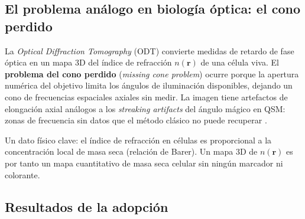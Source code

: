\documentclass[12pt, a4paper]{article}
\begin{document}
\subsection{El problema análogo en biología óptica: el cono perdido}

La \emph{Optical Diffraction Tomography} (ODT) convierte medidas de retardo de fase óptica en un mapa 3D del índice de refracción $n(\mathbf{r})$ de una célula viva. El \textbf{problema del cono perdido} (\emph{missing cone problem}) ocurre porque la apertura numérica del objetivo limita los ángulos de iluminación disponibles, dejando un cono de frecuencias espaciales axiales sin medir. La imagen tiene artefactos de elongación axial análogos a los \emph{streaking artifacts} del ángulo mágico en QSM: zonas de frecuencia sin datos que el método clásico no puede recuperar \cite{Park2018QPI_review}.

Un dato físico clave: el índice de refracción en células es proporcional a la concentración local de masa seca (relación de Barer). Un mapa 3D de $n(\mathbf{r})$ es por tanto un mapa cuantitativo de masa seca celular sin ningún marcador ni colorante.

\subsection{Resultados de la adopción}
\end{document}
